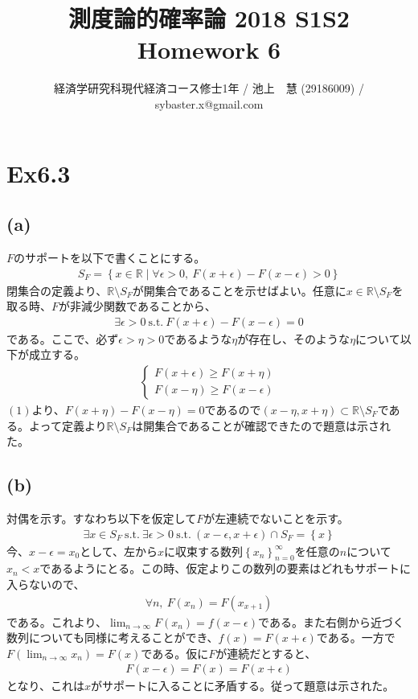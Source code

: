\documentclass{article}
\begin{document}
\title{測度論的確率論 2018 S1S2 \\ 
Homework 6}
\author{経済学研究科現代経済コース修士1年 / 池上　慧 (29186009) / sybaster.x@gmail.com}
\maketitle

\section{Ex6.3}
\subsection{(a)}
$F$のサポートを以下で書くことにする。
\begin{align*}
	S_F = \left\{ x \in \mathbb{R} \mid \forall \epsilon > 0, \ F(x + \epsilon) - F(x - \epsilon) > 0 \right\}
\end{align*}
閉集合の定義より、$\mathbb{R} \setminus S_F$が開集合であることを示せばよい。任意に$x \in \mathbb{R} \setminus S_F$を取る時、$F$が非減少関数であることから、
\begin{align}
	\exists \epsilon > 0\ \text{s.t.}\ F(x + \epsilon) - F(x - \epsilon) = 0
\end{align}
である。ここで、必ず$\epsilon > \eta > 0$であるような$\eta$が存在し、そのような$\eta$について以下が成立する。
\begin{align*}
	\begin{cases}
	F(x + \epsilon) \geq F(x + \eta)\\
	F(x -\eta) \geq F(x -\epsilon)
	\end{cases}
\end{align*}
$(1)$より、$F(x + \eta) - F(x - \eta) = 0$であるので$(x-\eta, x+\eta) \subset \mathbb{R} \setminus S_F$である。よって定義より$\mathbb{R} \setminus S_F$は開集合であることが確認できたので題意は示された。

\subsection{(b)}
対偶を示す。すなわち以下を仮定して$F$が左連続でないことを示す。
\begin{align*}
	\exists x \in S_F\ \text{s.t.}\ \exists \epsilon > 0\ \text{s.t.}\ (x-\epsilon, x+\epsilon) \cap S_F = \left\{ x \right\}
\end{align*}
今、$x-\epsilon = x_0$として、左から$x$に収束する数列$\left\{ x_n \right\}_{n = 0}^{\infty}$を任意の$n$について$x_n < x$であるようにとる。この時、仮定よりこの数列の要素はどれもサポートに入らないので、
\begin{align*}
	\forall n,\ F(x_n) = F(x_{x+1})
\end{align*}
である。これより、$\lim_{n \to \infty} F(x_n) = f(x-\epsilon)$である。また右側から近づく数列についても同様に考えることができ、$f(x) = F(x + \epsilon)$である。一方で$F(\lim_{n \to \infty} x_n) = F(x)$である。仮に$F$が連続だとすると、
\begin{align*}
F(x - \epsilon) = F(x) = F(x + \epsilon)
\end{align*}
となり、これは$x$がサポートに入ることに矛盾する。従って題意は示された。
\end{document}
